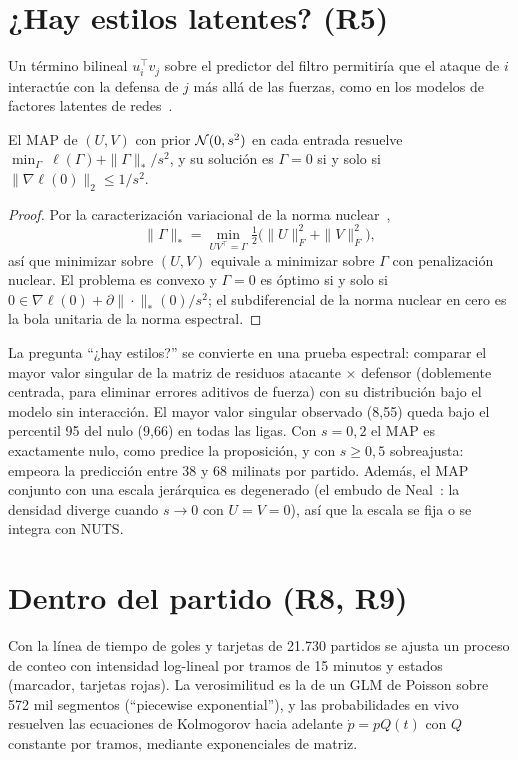 \section{¿Hay estilos latentes? (R5)}

Un término bilineal $u_i^\top v_j$ sobre el predictor del filtro permitiría que el ataque de $i$ interactúe con la defensa de $j$ más allá de las fuerzas, como en los modelos de factores latentes de redes~\cite{hoff2005}.

\begin{proposicion} \dem
El MAP de $(U,V)$ con prior $\mathcal{N}(0,s^2)$ en cada entrada resuelve $\min_\Gamma\ \ell(\Gamma)+\|\Gamma\|_*/s^2$, y su solución es $\Gamma=0$ si y solo si $\|\nabla\ell(0)\|_2\le1/s^2$.
\end{proposicion}

\begin{proof}
Por la caracterización variacional de la norma nuclear~\cite{recht2010},
\[
\|\Gamma\|_*=\min_{UV^\top=\Gamma}\tfrac12\big(\|U\|_F^2+\|V\|_F^2\big),
\]
así que minimizar sobre $(U,V)$ equivale a minimizar sobre $\Gamma$ con penalización nuclear. El problema es convexo y $\Gamma=0$ es óptimo si y solo si $0\in\nabla\ell(0)+\partial\|\cdot\|_*(0)/s^2$; el subdiferencial de la norma nuclear en cero es la bola unitaria de la norma espectral.
\end{proof}

La pregunta ``¿hay estilos?'' se convierte en una prueba espectral: comparar el mayor valor singular de la matriz de residuos atacante $\times$ defensor (doblemente centrada, para eliminar errores aditivos de fuerza) con su distribución bajo el modelo sin interacción. El mayor valor singular observado (8,55) queda bajo el percentil 95 del nulo (9,66) en todas las ligas. Con $s=0{,}2$ el MAP es exactamente nulo, como predice la proposición, y con $s\ge0{,}5$ sobreajusta: empeora la predicción entre 38 y 68 milinats por partido. Además, el MAP conjunto con una escala jerárquica es degenerado (el embudo de Neal~\cite{neal2003}: la densidad diverge cuando $s\to0$ con $U=V=0$), así que la escala se fija o se integra con NUTS.

\section{Dentro del partido (R8, R9)}
\label{sec:envivo}

Con la línea de tiempo de goles y tarjetas de 21.730 partidos se ajusta un proceso de conteo con intensidad log-lineal por tramos de 15 minutos y estados (marcador, tarjetas rojas). La verosimilitud es la de un GLM de Poisson sobre 572 mil segmentos (``piecewise exponential''), y las probabilidades en vivo resuelven las ecuaciones de Kolmogorov hacia adelante $\dot p=pQ(t)$ con $Q$ constante por tramos, mediante exponenciales de matriz.

